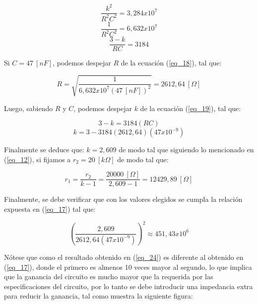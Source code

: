 \documentclass[12pt,a4paper]{article}
\begin{document}
\begin{equation}
    \label{eq_17}
    \frac{k^2}{R^{2}C^{2}} = 3,284x10^{7}
\end{equation}
\begin{equation}
    \label{eq_18}
    \frac{1}{R^{2}C^{2}} = 6,632x10^{7}
\end{equation}
\begin{equation}
    \label{eq_19}
    \frac{3-k}{RC} = 3184
\end{equation}

Si $C = 47 \ [nF]$, podemos despejar $R$ de la ecuación (\ref{eq_18}), tal que:

\begin{equation}
    \label{eq_20}
    R = \sqrt{\frac{1}{6,632x10^{7} (47 \ [nF])^2}} = 2612,64 \ [\Omega]
\end{equation}

Luego, sabiendo $R$ y $C$, podemos despejar $k$ de la ecuación (\ref{eq_19}), tal que:

\begin{equation}
    \label{eq_21}
    3 - k = 3184(RC) 
\end{equation}
\begin{equation}
    \label{eq_22}
    k = 3 - 3184(2612,64)(47x10^{-9})
\end{equation}

Finalmente se deduce que: $k = 2,609$ de modo tal que siguiendo lo mencionado en (\ref{eq_12}), si fijamos a $r_2 = 20 \ [k \Omega]$ de modo tal que:

\begin{equation}
    \label{eq_23}
    r_1 = \frac{r_2}{k-1} = \frac{20000 \ [\Omega]}{2,609 - 1} = 12429,89\ [\Omega]
\end{equation}

Finalmente, se debe verificar que con los valores elegidos se cumpla la relación expuesta en (\ref{eq_17}) tal que:

\begin{equation}
    \label{eq_24}
    \left(\frac{2,609}{2612,64(47x10^{-9})}\right)^2 \approx 451,43x10^6
\end{equation}

Nótese que como el resultado obtenido en (\ref{eq_24}) es diferente al obtenido en (\ref{eq_17}), donde el primero es almenos 10 veces mayor al segundo, lo que implica que la ganancia del circuito es mucho mayor que la requerida por las especificaciones del circuito, por lo tanto se debe introducir una impedancia extra para reducir la ganancia, tal como muestra la siguiente figura:
\end{document}
